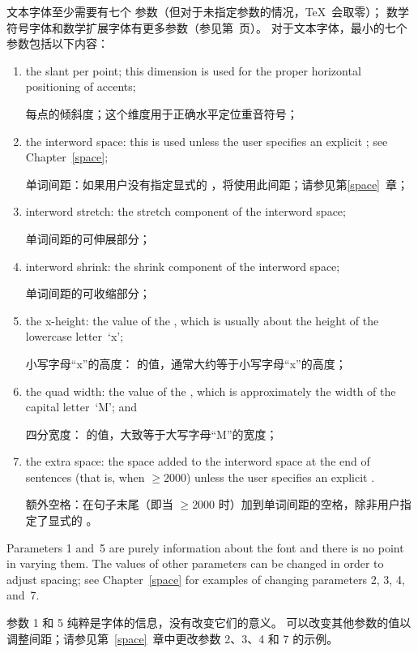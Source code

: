 文本字体至少需要有七个  参数（但对于未指定参数的情况，\TeX\ 会取零）；
数学符号字体和数学扩展字体有更多参数（参见第~\pageref{fam23:fontdims}页）。
对于文本字体，最小的七个参数包括以下内容：
\begin{enumerate} \item the slant per point; this dimension is used
    for the proper horizontal positioning of accents;
\awp

每点的倾斜度；这个维度用于正确水平定位重音符号；
\item the interword space: this is used unless the user
    specifies an explicit ;
    see Chapter~\ref{space};

    单词间距：如果用户没有指定显式的 ，将使用此间距；请参见第\ref{space}~章；
\item interword stretch: the stretch component of the interword
    space;

    单词间距的可伸展部分；
\item interword shrink: the shrink component of
    the interword space;

    单词间距的可收缩部分；
\item the x-height: the value of
    the  , which is usually about the
    height of the lowercase letter~`x'; 

    小写字母“x”的高度：  的值，通常大约等于小写字母“x”的高度；
\item the quad width:
    the value of the  , which is
    approximately the width of the capital letter~`M'; and

    四分宽度：  的值，大致等于大写字母“M”的宽度；
\item the extra space: the space added to the interword space
at the end of sentences (that is, when ${}\geq2000$)
unless the user specifies an explicit .

额外空格：在句子末尾（即当 ${}\geq2000$ 时）加到单词间距的空格，除非用户指定了显式的 。
\end{enumerate}

Parameters 1 and~5 are purely information about the font
and there is no point in varying them.
The values of other parameters can be changed in order to
adjust spacing; see Chapter~\ref{space} for examples
of changing parameters 2, 3, 4, and~7.

参数 1 和 5 纯粹是字体的信息，没有改变它们的意义。
可以改变其他参数的值以调整间距；请参见第~\ref{space}~章中更改参数 2、3、4 和 7 的示例。


